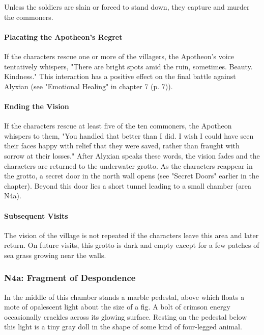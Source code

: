 \documentclass[letterpaper, 11pt, bg=full, twocolumn]{dndbook}
\begin{document}
Unless the soldiers are slain or forced to stand down, they capture and murder the commoners.

\paragraph{Placating the Apotheon's Regret}

If the characters rescue one or more of the villagers, the Apotheon's voice tentatively whispers, "There are bright spots amid the ruin, sometimes. Beauty. Kindness." This interaction has a positive effect on the final battle against Alyxian (see "Emotional Healing" in chapter 7 (p. 7)).

\paragraph{Ending the Vision}

If the characters rescue at least five of the ten commoners, the Apotheon whispers to them, "You handled that better than I did. I wish I could have seen their faces happy with relief that they were saved, rather than fraught with sorrow at their losses." After Alyxian speaks these words, the vision fades and the characters are returned to the underwater grotto. As the characters reappear in the grotto, a secret door in the north wall opens (see "Secret Doors" earlier in the chapter). Beyond this door lies a short tunnel leading to a small chamber (area N4a).

\paragraph{Subsequent Visits}

The vision of the village is not repeated if the characters leave this area and later return. On future visits, this grotto is dark and empty except for a few patches of sea grass growing near the walls.

\subsubsection{N4a: Fragment of Despondence}

\begin{DndReadAloud}
In the middle of this chamber stands a marble pedestal, above which floats a mote of opalescent light about the size of a fig. A bolt of crimson energy occasionally crackles across its glowing surface. Resting on the pedestal below this light is a tiny gray doll in the shape of some kind of four-legged animal.
\end{DndReadAloud}
\end{document}
